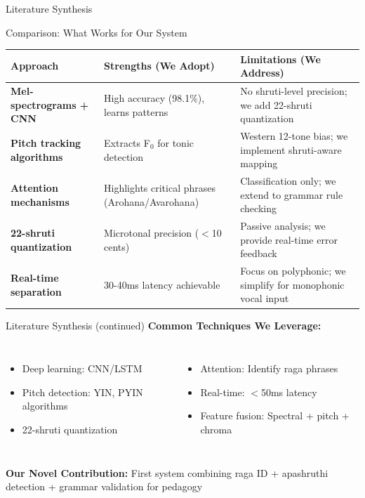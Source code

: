 \documentclass[aspectratio=169,11pt]{beamer}
\begin{document}
	\begin{frame}{Literature Synthesis}
		
		\begin{block}{Comparison: What Works for Our System}
			\begin{table}
				\footnotesize
				\begin{tabular}{p{3.5cm}p{4.2cm}p{4.5cm}}
					\toprule
					\textbf{Approach} & \textbf{Strengths (We Adopt)} & \textbf{Limitations (We Address)} \\
					\midrule
					\textbf{Mel-spectrograms + CNN} & High accuracy (98.1\%), learns patterns & No shruti-level precision; we add 22-shruti quantization \\
					\addlinespace
					\textbf{Pitch tracking algorithms} & Extracts F$_0$ for tonic detection & Western 12-tone bias; we implement shruti-aware mapping \\
					\addlinespace
					\textbf{Attention mechanisms} & Highlights critical phrases (Arohana/Avarohana) & Classification only; we extend to grammar rule checking \\
					\addlinespace
					\textbf{22-shruti quantization} & Microtonal precision ($<$10 cents) & Passive analysis; we provide real-time error feedback \\
					\addlinespace
					\textbf{Real-time separation} & 30-40ms latency achievable & Focus on polyphonic; we simplify for monophonic vocal input \\
					\bottomrule
				\end{tabular}
			\end{table}
		\end{block}
	\end{frame}
	
	\begin{frame}{Literature Synthesis (continued)}
		\textbf{Common Techniques We Leverage:}
		\begin{columns}
			\begin{itemize}
				\item Deep learning: CNN/LSTM
				\item Pitch detection: YIN, PYIN algorithms
				\item 22-shruti quantization
			\end{itemize}
			
			\begin{itemize}
				\item Attention: Identify raga phrases
				\item Real-time: $<$50ms latency
				\item Feature fusion: Spectral + pitch + chroma
			\end{itemize}
		\end{columns}
		
		\vspace{0.5cm}
		
		\textbf{Our Novel Contribution:} First system combining raga ID + apashruthi detection + grammar validation for pedagogy
	\end{frame}
	
\end{document}
